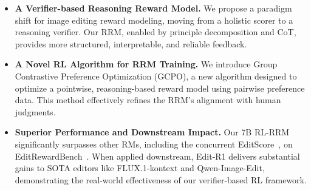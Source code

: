 \begin{itemize}[leftmargin=*]
    \item \textbf{A Verifier-based Reasoning Reward Model.} We propose a paradigm shift for image editing reward modeling, moving from a holistic scorer to a reasoning verifier. Our RRM, enabled by principle decomposition and CoT, provides more structured, interpretable, and reliable feedback.
    
    \item \textbf{A Novel RL Algorithm for RRM Training.} We introduce Group Contrastive Preference Optimization (GCPO), a new algorithm designed to optimize a pointwise, reasoning-based reward model using pairwise preference data. This method effectively refines the RRM's alignment with human judgments.
    
    \item \textbf{Superior Performance and Downstream Impact.} Our 7B RL-RRM significantly surpasses other RMs, including the concurrent EditScore~\citep{luo2025editscore}, on EditRewardBench~\citep{luo2025editscore}. When applied downstream, Edit-R1 delivers substantial gains to SOTA editors like FLUX.1-kontext and Qwen-Image-Edit, demonstrating the real-world effectiveness of our verifier-based RL framework.
\end{itemize}

